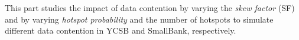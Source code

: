 


This part studies the impact of data contention by varying the \textit{skew factor} (SF) %
and by varying \textit{hotspot probability} %
and the number of hotspots to simulate different data contention in YCSB and SmallBank, respectively.


